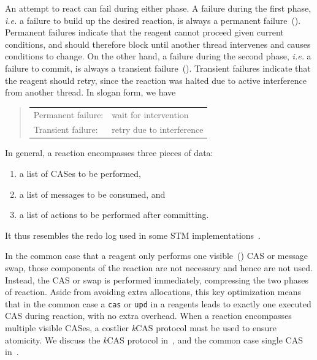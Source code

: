 \documentclass[preprint,nocopyrightspace]{sigplanconf}
\begin{document}
An attempt to react can fail during either phase.  A failure during the first
phase, \emph{i.e.} a failure to build up the desired reaction, is always a
permanent failure~().  Permanent failures indicate that the
reagent cannot proceed given current conditions, and should therefore block
until another thread intervenes and causes conditions to change.  On the other
hand, a failure during the second phase, \emph{i.e.} a failure to commit, is
always a transient failure~().  Transient failures indicate that
the reagent should retry, since the reaction was halted due to active
interference from another thread.  In slogan form, we have
\begin{quotation}\noindent
\begin{tabular}{l@{\ }l}
Permanent failure:&wait for intervention\\
Transient failure:&retry due to interference
\end{tabular}
\end{quotation}
In general, a reaction encompasses three pieces of data:
\begin{enumerate}
\item a list of CASes to be performed,
\item a list of messages to be consumed, and
\item a list of actions to be performed after committing.
\end{enumerate}
It thus resembles the redo log used in some STM implementations~\cite{?}.

In the common case that a reagent only performs one visible~()
CAS or message swap, those components of the reaction are not necessary and
hence are not used.  Instead, the CAS or swap is performed immediately,
compressing the two phases of reaction.  Aside from avoiding extra allocations,
this key optimization means that in the common case a \lstinline{cas} or
\lstinline{upd} in a reagents leads to exactly one executed CAS during reaction,
with no extra overhead.  When a reaction encompasses multiple visible CASes, a
costlier \emph{k}CAS protocol must be used to ensure atomicity.  We discuss the
\emph{k}CAS protocol in~, and the common case single CAS
in~.
\end{document}
